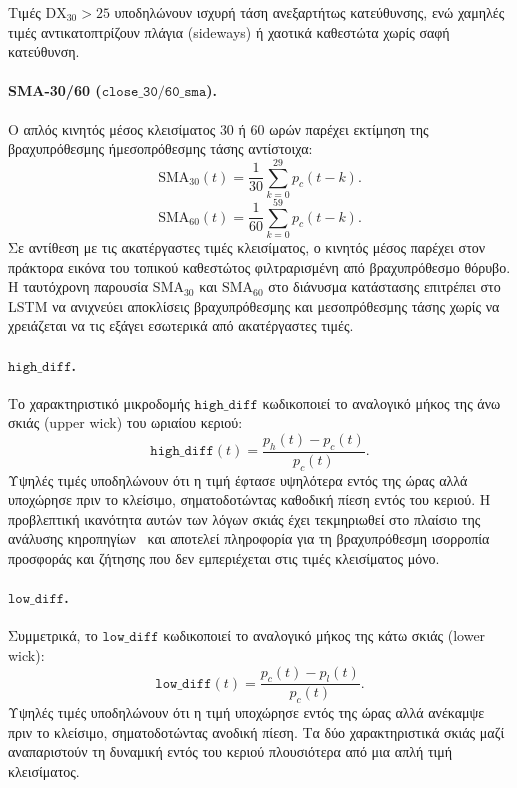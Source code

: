 Τιμές $\mathrm{DX}_{30} > 25$ υποδηλώνουν ισχυρή τάση ανεξαρτήτως
κατεύθυνσης, ενώ χαμηλές τιμές αντικατοπτρίζουν πλάγια (sideways) ή
χαοτικά καθεστώτα χωρίς σαφή κατεύθυνση.

\paragraph{SMA-30/60 ($\mathtt{close\_30/60\_sma}$).}
\label{par:sma}
Ο απλός κινητός μέσος κλεισίματος $30$ ή $60$ ωρών παρέχει εκτίμηση της
βραχυπρόθεσμης ήμεσοπρόθεσμης τάσης αντίστοιχα:
\begin{equation}
  \mathrm{SMA}_{30}(t) = \frac{1}{30}\sum_{k=0}^{29} p_c(t-k).
  \label{eq:sma30}
\end{equation}
\begin{equation}
  \mathrm{SMA}_{60}(t) = \frac{1}{60}\sum_{k=0}^{59} p_c(t-k).
  \label{eq:sma60}
\end{equation}
Σε αντίθεση με τις ακατέργαστες τιμές κλεισίματος, ο κινητός μέσος παρέχει
στον πράκτορα εικόνα του τοπικού καθεστώτος φιλτραρισμένη από βραχυπρόθεσμο
θόρυβο. Η ταυτόχρονη παρουσία $\mathrm{SMA}_{30}$ και $\mathrm{SMA}_{60}$ στο διάνυσμα
κατάστασης επιτρέπει στο LSTM να ανιχνεύει αποκλίσεις βραχυπρόθεσμης και
μεσοπρόθεσμης τάσης χωρίς να χρειάζεται να τις εξάγει εσωτερικά από
ακατέργαστες τιμές.

\paragraph{$\mathtt{high\_diff}$.}
Το χαρακτηριστικό μικροδομής $\mathtt{high\_diff}$ κωδικοποιεί το αναλογικό
μήκος της άνω σκιάς (upper wick) του ωριαίου κεριού:
\begin{equation}
  \mathtt{high\_diff}(t) = \frac{p_h(t) - p_c(t)}{p_c(t)}.
  \label{eq:highdiff}
\end{equation}
Υψηλές τιμές υποδηλώνουν ότι η τιμή έφτασε υψηλότερα εντός της ώρας αλλά
υποχώρησε πριν το κλείσιμο, σηματοδοτώντας καθοδική πίεση εντός του κεριού. Η
προβλεπτική ικανότητα αυτών των λόγων σκιάς έχει τεκμηριωθεί στο πλαίσιο της
ανάλυσης κηροπηγίων~\cite{avramelou2024deep} και αποτελεί πληροφορία για τη βραχυπρόθεσμη
ισορροπία προσφοράς και ζήτησης που δεν εμπεριέχεται στις τιμές κλεισίματος
μόνο.

\paragraph{$\mathtt{low\_diff}$.}
Συμμετρικά, το $\mathtt{low\_diff}$ κωδικοποιεί το αναλογικό μήκος της κάτω
σκιάς (lower wick):
\begin{equation}
  \mathtt{low\_diff}(t) = \frac{p_c(t) - p_l(t)}{p_c(t)}.
  \label{eq:lowdiff}
\end{equation}
Υψηλές τιμές υποδηλώνουν ότι η τιμή υποχώρησε εντός της ώρας αλλά ανέκαμψε
πριν το κλείσιμο, σηματοδοτώντας ανοδική πίεση. Τα δύο χαρακτηριστικά σκιάς
μαζί αναπαριστούν τη δυναμική εντός του κεριού πλουσιότερα από μια απλή τιμή
κλεισίματος.

